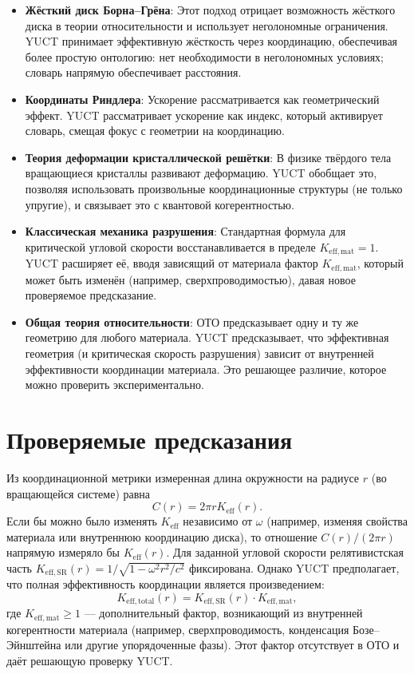 \documentclass[12pt,a4paper]{article}
\begin{document}
	\begin{itemize}
		\item \textbf{Жёсткий диск Борна–Грёна}: Этот подход отрицает возможность жёсткого диска в теории относительности и использует неголономные ограничения. YUCT принимает эффективную жёсткость через координацию, обеспечивая более простую онтологию: нет необходимости в неголономных условиях; словарь напрямую обеспечивает расстояния.
		\item \textbf{Координаты Риндлера}: Ускорение рассматривается как геометрический эффект. YUCT рассматривает ускорение как индекс, который активирует словарь, смещая фокус с геометрии на координацию.
		\item \textbf{Теория деформации кристаллической решётки}: В физике твёрдого тела вращающиеся кристаллы развивают деформацию. YUCT обобщает это, позволяя использовать произвольные координационные структуры (не только упругие), и связывает это с квантовой когерентностью.
		\item \textbf{Классическая механика разрушения}: Стандартная формула для критической угловой скорости восстанавливается в пределе \(K_{\mathrm{eff,mat}} = 1\). YUCT расширяет её, вводя зависящий от материала фактор \(K_{\mathrm{eff,mat}}\), который может быть изменён (например, сверхпроводимостью), давая новое проверяемое предсказание.
		\item \textbf{Общая теория относительности}: ОТО предсказывает одну и ту же геометрию для любого материала. YUCT предсказывает, что эффективная геометрия (и критическая скорость разрушения) зависит от внутренней эффективности координации материала. Это решающее различие, которое можно проверить экспериментально.
	\end{itemize}
	
	\section{Проверяемые предсказания}
	\label{sec:predict}
	
	Из координационной метрики измеренная длина окружности на радиусе \(r\) (во вращающейся системе) равна
	\[
	C(r) = 2\pi r K_{\mathrm{eff}}(r).
	\]
	Если бы можно было изменять \(K_{\mathrm{eff}}\) независимо от \(\omega\) (например, изменяя свойства материала или внутреннюю координацию диска), то отношение \(C(r)/(2\pi r)\) напрямую измеряло бы \(K_{\mathrm{eff}}(r)\). Для заданной угловой скорости релятивистская часть \(K_{\mathrm{eff,SR}}(r) = 1/\sqrt{1-\omega^2 r^2/c^2}\) фиксирована. Однако YUCT предполагает, что полная эффективность координации является произведением:
	\[
	K_{\mathrm{eff,total}}(r) = K_{\mathrm{eff,SR}}(r) \cdot K_{\mathrm{eff,mat}},
	\]
	где \(K_{\mathrm{eff,mat}} \ge 1\) — дополнительный фактор, возникающий из внутренней когерентности материала (например, сверхпроводимость, конденсация Бозе–Эйнштейна или другие упорядоченные фазы). Этот фактор отсутствует в ОТО и даёт решающую проверку YUCT.
	
\end{document}
